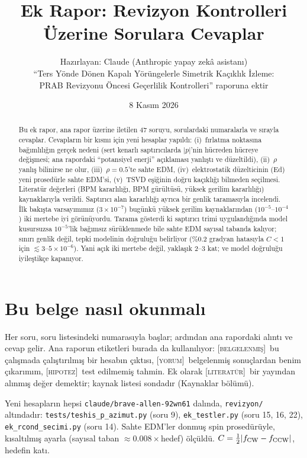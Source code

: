 \documentclass[11pt,a4paper]{article}
\title{Ek Rapor: Revizyon Kontrolleri Üzerine Sorulara Cevaplar}
\author{Hazırlayan: Claude (Anthropic yapay zekâ asistanı)\\
\small ``Ters Yönde Dönen Kapalı Yörüngelerle Simetrik Kaçıklık İzleme:\\ \small PRAB Revizyonu Öncesi
Geçerlilik Kontrolleri'' raporuna ektir}
\date{8 Kasım 2026}
\newcommand{\kod}[1]{{\XeTeXinterchartokenstate=0\texttt{#1}}}
\newcommand{\BEL}{\textsc{[belgelenmiş]}}
\newcommand{\YOR}{\textsc{[yorum]}}
\newcommand{\HIP}{\textsc{[hipotez]}}
\newcommand{\LIT}{\textsc{[literatür]}}
\newcounter{soru}
\begin{document}
\sloppy
\maketitle

\begin{abstract}
\noindent Bu ek rapor, ana rapor üzerine iletilen 47 soruyu, sorulardaki numaralarla ve sırayla cevaplar.
Cevapların bir kısmı için yeni hesaplar yapıldı: (i)~fırlatma noktasına bağımlılığın gerçek nedeni
(sert kenarlı saptırıcılarda $|p|$'nin hücreden hücreye değişmesi; ana rapordaki ``potansiyel enerji''
açıklaması yanlıştı ve düzeltildi), (ii)~$\rho$ yanlış bilinirse ne olur, (iii)~$\rho=0.5$'te sahte EDM,
(iv)~elektrostatik düzelticinin (Ed) yeni prosedürle sahte EDM'si, (v)~TSVD eşiğinin doğru kaçıklığı
bilmeden seçilmesi. Literatür değerleri (BPM kararlılığı, BPM gürültüsü, yüksek gerilim kararlılığı)
kaynaklarıyla verildi. Saptırıcı alan kararlılığı ayrıca bir genlik taramasıyla incelendi. İlk bakışta
varsayımımız ($3\times10^{-7}$) bugünkü yüksek gerilim kaynaklarından ($10^{-5}$--$10^{-4}$) iki mertebe
iyi görünüyordu. Tarama gösterdi ki saptırıcı trimi uygulandığında model kusursuzsa $10^{-5}$'lik bağımsız
sürüklenmede bile sahte EDM sayısal tabanda kalıyor; sınırı genlik değil, tepki modelinin doğruluğu
belirliyor (\%0.2 gradyan hatasıyla $C<1$ için $\lesssim3$--$5\times10^{-6}$). Yani açık iki mertebe değil,
yaklaşık 2--3 kat; ve model doğruluğu iyileştikçe kapanıyor.
\end{abstract}

\tableofcontents
\newpage

\section{Bu belge nasıl okunmalı}
Her soru, soru listesindeki numarasıyla başlar; ardından ana rapordaki alıntı ve cevap gelir. Ana raporun
etiketleri burada da kullanılıyor: \BEL\ bu çalışmada çalıştırılmış bir hesabın çıktısı, \YOR\ belgelenmiş
sonuçlardan benim çıkarımım, \HIP\ test edilmemiş tahmin. Ek olarak \LIT\ bir yayından alınmış değer
demektir; kaynak listesi sondadır (Kaynaklar bölümü).

Yeni hesapların hepsi \kod{claude/brave-allen-92wn61} dalında, \kod{revizyon/} altındadır:
\kod{tests/teshis\_p\_azimut.py} (soru 9), \kod{ek\_testler.py} (soru 15, 16, 22),
\kod{ek\_rcond\_secimi.py} (soru 14). Sahte EDM'ler donmuş spin prosedürüyle, kısaltılmış ayarla
(sayısal taban $\approx0.008\times$hedef) ölçüldü. $C=\tfrac12|f_{\rm CW}-f_{\rm CCW}|$, hedefin katı.
\end{document}
